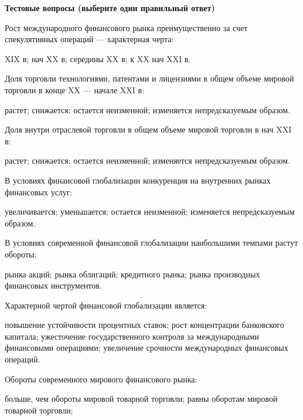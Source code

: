 \documentclass[12pt, table]{exam}
\begin{document}
\pagebreak
\noindent\textbf{Тестовые вопросы (выберите один правильный ответ)}

\begin{questions}
\begin{multicols}{2}
\setlength{\columnsep}{1cm}

\question Рост международного финансового рынка преимущественно за счет спекулятивных операций — характерная черта:
	 \begin{choices}
	 \CC XIX в;
	 \choice нач XX в;
	 \choice середины XX в;
	 \choice к XX  нач XXI в.
	 \end{choices}
\question Доля торговли технологиями, патентами и лицензиями в общем объеме мировой торговли в конце XX — начале XXI в:
	 \begin{choices}
	 \choice растет;
	 \choice снижается;
	 \choice остается неизменной;
	 \CC изменяется непредсказуемым образом.
	 \end{choices}
\question Доля внутри отраслевой торговли в общем объеме мировой торговли в нач XXI в:
	 \begin{choices}
	 \CC растет;
	 \choice снижается;
	 \choice остается неизменной;
	 \choice изменяется непредсказуемым образом.
	 \end{choices}
\question В условиях финансовой глобализации конкуренция на внутренних рынках финансовых услуг:
	 \begin{choices}
	 \choice увеличивается;
	 \CC уменьшается;
	 \choice остается неизменной;
	 \choice изменяется непредсказуемым образом.
	 \end{choices}
\question В условиях современной финансовой глобализации наибольшими темпами растут обороты:
	 \begin{choices}
	 \choice рынка акций;
	 \CC рынка облигаций;
	 \choice кредитного рынка;
	 \choice рынка производных финансовых инструментов.
	 \end{choices}
\question Характерной чертой финансовой глобализации является:
	 \begin{choices}
	 \choice повышение устойчивости процентных ставок;
	 \choice рост концентрации банковского капитала;
	 \choice ужесточение государственного контроля за международными финансовыми операциями;
	 \CC увеличение срочности международных финансовых операций.
	 \end{choices}
\question Обороты современного мирового финансового рынка:
	 \begin{choices}
	 \choice больше, чем обороты мировой товарной торговли;
	 \choice равны оборотам мировой товарной торговли;

\end{choices}
\end{multicols}
\end{questions}
\end{document}

